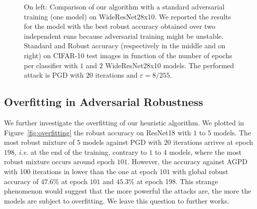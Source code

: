 \begin{figure}[!ht]
\begin{center}
\caption{On left: Comparison of our algorithm with a standard adversarial training (one model) on WideResNet28x10. We reported the results for the model with the best robust accuracy obtained over two independent runs because adversarial training might be unstable. Standard and Robust accuracy (respectively in the middle and on right) on CIFAR-10 test images in function of the number of epochs per classifier with $1$ and $2$ WideResNet28x10 models. The performed attack is PGD with $20$ iterations and $\varepsilon=8/255$.}
\label{fig:xp-wideresnet}
\end{center}
\vspace{-0.1cm}
\end{figure}


\subsection{Overfitting in Adversarial Robustness}
We further investigate the overfitting of our heuristic algorithm. We plotted in Figure~\ref{fig:overfitting} the robust accuracy on ResNet18 with $1$ to $5$ models. The most robust mixture of $5$ models against PGD with $20$ iterations arrives at epoch $198$, \emph{i.e.} at the end of the training, contrary to $1$ to $4$ models, where the most robust mixture occurs around epoch $101$. However, the accuracy against AGPD with 100 iterations in lower than the one at epoch $101$ with global robust accuracy of $47.6\%$ at epoch $101$ and $45.3\%$ at epoch 198. This strange phenomenon would suggest that the more powerful the attacks are, the more the models are subject to overfitting. We leave this question to further works.


